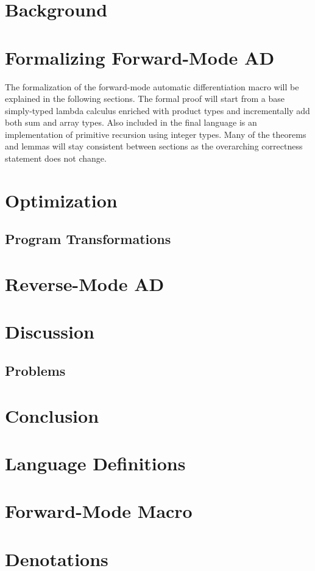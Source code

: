\documentclass[11pt, final]{article}
\begin{document}

\newpage


\newpage

\setcounter{page}{3}
\tableofcontents
\newpage



\section{Background}







\section{Formalizing Forward-Mode AD}
  The formalization of the forward-mode automatic differentiation macro will be explained in the following sections.
  The formal proof will start from a base simply-typed lambda calculus enriched with product types and incrementally add both sum and array types.
  Also included in the final language is an implementation of primitive recursion using integer types.
  Many of the theorems and lemmas will stay consistent between sections as the overarching correctness statement does not change.

  
  
  
\section{Optimization}
  \subsection{Program Transformations}
\section{Reverse-Mode AD}
\section{Discussion}
  \subsection{Problems}
  
\section{Conclusion}

\appendix
\section{Language Definitions}
\section{Forward-Mode Macro}
\section{Denotations}
\printbibliography
\makeatother
\end{document}
